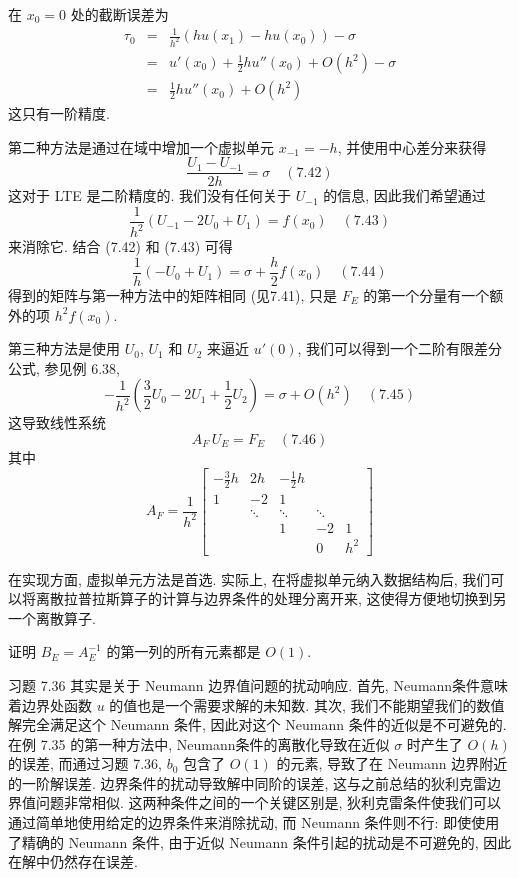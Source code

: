 \documentclass[a4paper]{ctexart}
\newcommand{\hl}[1]
{\noindent {\bf {#1}}}
\begin{document}
{在 $x_0 = 0$ 处的截断误差为
\begin{eqnarray*}
\tau_0 
&=& \frac{1}{h^2} \left(hu(x_1) - hu(x_0)\right) - \sigma\\
&=& u'(x_0) + \frac{1}{2}hu''(x_0) + O(h^2) - \sigma\\
&=& \frac{1}{2}hu''(x_0) + O(h^2)
\end{eqnarray*}
这只有一阶精度.

第二种方法是通过在域中增加一个虚拟单元 $x_{-1} = -h$, 并使用中心差分来获得
$$
\frac{U_1 - U_{-1}}{2h} = \sigma \quad (7.42)
$$
这对于 LTE 是二阶精度的. 我们没有任何关于 $U_{-1}$ 的信息, 因此我们希望通过
$$
\frac{1}{h^2}(U_{-1} - 2U_0 + U_1) = f(x_0) \quad (7.43)
$$
来消除它. 结合 (7.42) 和 (7.43) 可得
$$
\frac{1}{h}(-U_0 + U_1) = \sigma + \frac{h}{2}f(x_0) \quad (7.44)
$$
得到的矩阵与第一种方法中的矩阵相同 (见7.41), 只是 $F_E$ 
的第一个分量有一个额外的项 $h^2 f(x_0)$.

第三种方法是使用 $U_0$, $U_1$ 和 $U_2$ 来逼近 $u'(0)$,
我们可以得到一个二阶有限差分公式, 参见例 6.38,
$$
-\frac{1}{h^2}\left(\frac{3}{2}U_0 - 2U_1 + \frac{1}{2}U_2\right) 
= \sigma + O(h^2) \quad (7.45)
$$
这导致线性系统
$$
A_F \, U_E = F_E \quad (7.46)
$$
其中
$$
A_F = \frac{1}{h^2}
\begin{bmatrix}
-\frac{3}{2}h & 2h & -\frac{1}{2}h &\\
1 & -2 & 1 & &\\
  & \ddots & \ddots & \ddots& \\
&&1 & -2 & 1 \\
&&&0 & h^2
\end{bmatrix}
$$

在实现方面, 虚拟单元方法是首选. 实际上, 在将虚拟单元纳入数据结构后, 
我们可以将离散拉普拉斯算子的计算与边界条件的处理分离开来, 这使得方便地切换到另一个离散算子. 

\hl{习题 7.36} 证明 $B_E = A_E^{-1}$ 的第一列的所有元素都是 $O(1)$.

习题 7.36 其实是关于 Neumann 边界值问题的扰动响应. 首先, Neumann条件意味着边界处函数 
$u$ 的值也是一个需要求解的未知数. 其次, 我们不能期望我们的数值解完全满足这个 Neumann 条件, 
因此对这个 Neumann 条件的近似是不可避免的. 在例 7.35 的第一种方法中, 
Neumann条件的离散化导致在近似 $\sigma$ 时产生了 $O(h)$ 的误差, 
而通过习题 7.36, $b_0$ 包含了 $O(1)$ 的元素, 导致了在 Neumann 边界附近的一阶解误差. 
边界条件的扰动导致解中同阶的误差, 这与之前总结的狄利克雷边界值问题非常相似. 
这两种条件之间的一个关键区别是, 狄利克雷条件使我们可以通过简单地使用给定的边界条件来消除扰动, 
而 Neumann 条件则不行: 即使使用了精确的 Neumann 条件, 
由于近似 Neumann 条件引起的扰动是不可避免的, 因此在解中仍然存在误差. 

}
\end{document}

